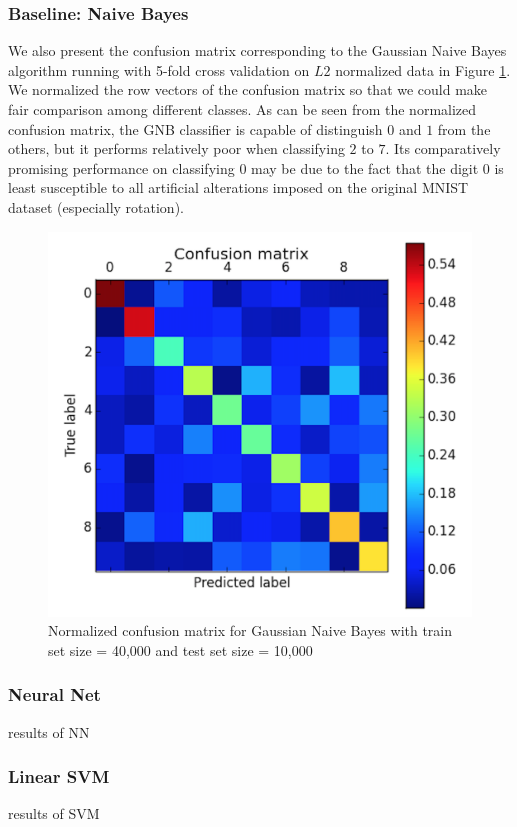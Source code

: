 \documentclass{acm_proc_article-sp}
\begin{document}
\subsubsection{Baseline: Naive Bayes}
We also present the confusion matrix corresponding to the Gaussian Naive Bayes algorithm running with 5-fold cross validation on $L2$ normalized data in Figure \ref{fig:gnb_cm}. We normalized the row vectors of the confusion matrix so that we could make fair comparison among different classes. As can be seen from the normalized confusion matrix, the GNB classifier is capable of distinguish $0$ and $1$ from the others, but it performs relatively poor when classifying $2$ to $7$. Its comparatively promising performance on classifying $0$ may be due to the fact that the digit $0$ is least susceptible to all artificial alterations imposed on the original MNIST dataset (especially rotation).
\begin{figure} 
\centering
\includegraphics[width=0.9\columnwidth]{graphs/gnb_cm1.png}  
\caption{Normalized confusion matrix for Gaussian Naive Bayes with train set size = 40,000 and test set size = 10,000}
\label{fig:gnb_cm}
\end{figure}


\subsubsection{Neural Net}
results of NN

\subsubsection{Linear SVM }
results of SVM
\end{document}
